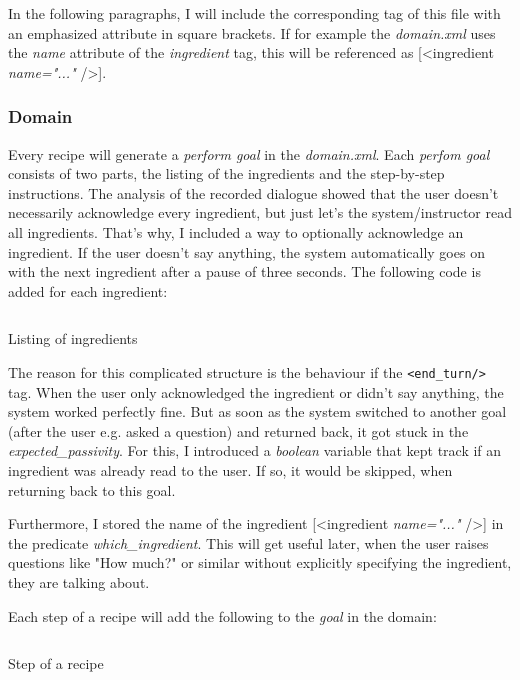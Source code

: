\documentclass[
	11pt, %
]{fphw}
\newenvironment{code}
    {\captionsetup{
        type=listing,
        skip=2pt,
        belowskip=15pt
        }}
    {}
\begin{document}
In the following paragraphs, I will include the corresponding tag of this file with an emphasized attribute in square brackets. If for example the \emph{domain.xml} uses the \emph{name} attribute of the \emph{ingredient} tag, this will be referenced as [<ingredient \emph{name="..."} />].

\subsubsection*{Domain}
Every recipe will generate a \emph{perform goal} in the \emph{domain.xml}. Each \emph{perfom goal} consists of two parts, the listing of the ingredients and the step-by-step instructions. The analysis of the recorded dialogue showed that the user doesn't necessarily acknowledge every ingredient, but just let's the system/instructor read all ingredients. That's why, I included a way to optionally acknowledge an ingredient. If the user doesn't say anything, the system automatically goes on with the next ingredient after a pause of three seconds. The following code is added for each ingredient:

\begin{code}
    \inputminted{xml}{includes/ingredients_listing.xml}
    \caption{Listing of ingredients}
\end{code}

The reason for this complicated structure is the behaviour if the \texttt{<end_turn/>} tag. When the user only acknowledged the ingredient or didn't say anything, the system worked perfectly fine. But as soon as the system switched to another goal (after the user e.g. asked a question) and returned back, it got stuck in the \emph{expected\_passivity}. For this, I introduced a \emph{boolean} variable that kept track if an ingredient was already read to the user. If so, it would be skipped, when returning back to this goal.

Furthermore, I stored the name of the ingredient [<ingredient \emph{name="..."} />] in the predicate \emph{which\_ingredient}. This will get useful later, when the user raises questions like "How much?" or similar without explicitly specifying the ingredient, they are talking about.

Each step of a recipe will add the following to the \emph{goal} in the domain:

\begin{code}
    \inputminted{xml}{includes/recipe_step.xml}
    \caption{Step of a recipe}
\end{code}
\end{document}
